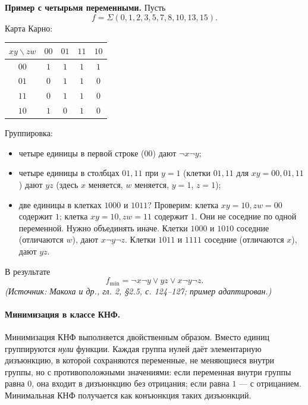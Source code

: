 \documentclass[a4paper,12pt]{article}
\begin{document}
\textbf{Пример с четырьмя переменными.} Пусть
\[
f=\Sigma(0,1,2,3,5,7,8,10,13,15).
\]
Карта Карно:
\begin{center}
\begin{tabular}{c|cccc}
\toprule
\(xy\backslash zw\) & \(00\) & \(01\) & \(11\) & \(10\) \\
\midrule
\(00\) & \(1\) & \(1\) & \(1\) & \(1\) \\
\(01\) & \(0\) & \(1\) & \(1\) & \(0\) \\
\(11\) & \(0\) & \(1\) & \(1\) & \(0\) \\
\(10\) & \(1\) & \(0\) & \(1\) & \(0\) \\
\bottomrule
\end{tabular}
\end{center}
Группировка:
\begin{itemize}
\item четыре единицы в первой строке (\(00\)) дают \(\neg x\neg y\);
\item четыре единицы в столбцах \(01,11\) при \(y=1\) (клетки \(01,11\) для \(xy=00,01,11\)) дают \(y z\) (здесь \(x\) меняется, \(w\) меняется, \(y=1\), \(z=1\));
\item две единицы в клетках \(1000\) и \(1011\)? Проверим: клетка \(xy=10, zw=00\) содержит \(1\); клетка \(xy=10, zw=11\) содержит \(1\). Они не соседние по одной переменной. Нужно объединять иначе. Клетки \(1000\) и \(1010\) соседние (отличаются \(w\)), дают \(x\neg y\neg z\). Клетки \(1011\) и \(1111\) соседние (отличаются \(x\)), дают \(yz\).
\end{itemize}
В результате
\[
f_{\min}=\neg x\neg y\lor yz\lor x\neg y\neg z.
\]
\textit{(Источник: Макоха и др., гл. 2, §2.5, с. 124--127; пример адаптирован.)}

\paragraph{Минимизация в классе КНФ.}
Минимизация КНФ выполняется двойственным образом. Вместо единиц группируются \emph{нули} функции. Каждая группа нулей даёт элементарную дизъюнкцию, в которой сохраняются переменные, не меняющиеся внутри группы, но с противоположными значениями: если переменная внутри группы равна \(0\), она входит в дизъюнкцию без отрицания; если равна \(1\) — с отрицанием. Минимальная КНФ получается как конъюнкция таких дизъюнкций.
\end{document}
